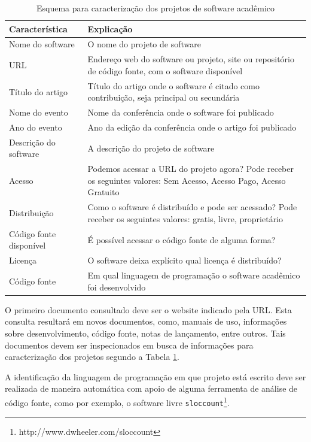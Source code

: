 \begin{table}[h]
\caption{Esquema para caracterização dos projetos de software acadêmico}
\centering
\begin{tabular}{ l p{11cm} }
  \hline
  Característica           & Explicação \\
  \hline
  Nome do software         & O nome do projeto de software \\
  URL                      & Endereço web do software ou projeto, site ou repositório de código fonte, com o software disponível \\
  Título do artigo         & Título do artigo onde o software é citado como contribuição, seja principal ou secundária \\
  Nome do evento           & Nome da conferência onde o software foi publicado \\
  Ano do evento            & Ano da edição da conferência onde o artigo foi publicado \\
  Descrição do software    & A descrição do projeto de software \\
  Acesso                   & Podemos acessar a URL do projeto agora? Pode receber os seguintes valores: Sem Acesso, Acesso Pago, Acesso Gratuito \\
  Distribuição             & Como o software é distribuído e pode ser acessado? Pode receber os seguintes valores: gratis, livre, proprietário \\
  Código fonte disponível  & É possível acessar o código fonte de alguma forma? \\
  Licença                  & O software deixa explícito qual licença é distribuído? \\
  Código fonte             & Em qual linguagem de programação o software acadêmico foi desenvolvido \\
  \hline
\end{tabular}
\label{esquema-caracteristicas}
\end{table}

O primeiro documento consultado deve ser o website indicado pela URL. Esta
consulta resultará em novos documentos, como, manuais de uso, informações sobre
desenvolvimento, código fonte, notas de lançamento, entre outros. 
Tais documentos devem ser inspecionados em busca de informações para
caracterização dos projetos segundo a Tabela \ref{esquema-caracteristicas}.

A identificação da linguagem de programação em que projeto está escrito deve ser
realizada de maneira automática com apoio de alguma ferramenta de análise de
código fonte, como por exemplo, o software livre
\texttt{sloccount}\footnote{http://www.dwheeler.com/sloccount}.

